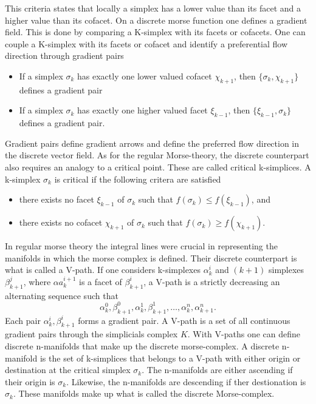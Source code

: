 This criteria states that locally a simplex has a lower value than its facet and
a higher value than its cofacet. On a discrete morse function one defines a
gradient field. This is done by comparing a K-simplex with its facets or
cofacets. One can couple a K-simplex with its facets or cofacet and identify a
preferential flow direction through gradient pairs
\begin{itemize}
    \item If a simplex $\sigma_k$ has exactly one lower valued cofacet $\chi_{k+1}$, then
          $\{\sigma_k,\chi_{k+1}\}$ defines a gradient pair
    \item If a simplex $\sigma_k$ has exactly one higher valued facet $\xi_{k-1}$, then
          $\{\xi_{k-1},\sigma_{k}\}$ defines a gradient pair.
\end{itemize}
Gradient pairs define gradient arrows and define the preferred flow direction in
the discrete vector field. As for the regular Morse-theory, the discrete
counterpart also requires an analogy to a critical point. These are called
critical k-simplices. A k-simplex $\sigma_k$ is critical if the following
critera are satisfied
\begin{itemize}
    \item there exists no facet $\xi_{k-1}$ of $\sigma_{k}$ such
    that $f(\sigma_k)\leq f(\xi_{k-1})$, and
    \item there exists no cofacet $\chi_{k+1}$ of $\sigma_{k}$ such
    that $f(\sigma_k)\geq f(\chi_{k+1})$.
\end{itemize}
In regular morse theory the integral lines were crucial in representing the
manifolds in which the morse complex is defined. Their discrete counterpart
is what is called a V-path. If one considers k-simplexes $\alpha^i_k$ and
$(k+1)$ simplexes $\beta^j_{k+1}$, where $\alpha a^{i+1}_k$ is a facet of $\beta^i_{k+1}$, a
V-path is a strictly decreasing an alternating sequence such that
\begin{equation}
    \alpha^0_k, \beta^0_{k+1},\alpha^1_k,\beta^1_{k+1},\dots,\alpha^n_k,\alpha^n_{k+1}.
\end{equation}
Each pair ${\alpha^i_k,\beta^i_{k+1}}$ forms a gradient pair. A V-path is a set
of all continuous gradient pairs through the simplicials complex $K$.
With V-paths one can define discrete n-manifolds that make up the discrete
morse-complex. A discrete n-manifold is the set of k-simplices that belongs to a
V-path with either origin or destination at the critical simplex $\sigma_k$.
The n-manifolds are either ascending if their origin is $\sigma_k$. Likewise,
the n-manifolds are descending if ther destionation is $\sigma_k$. These
manifolds make up what is called the discrete Morse-complex.

